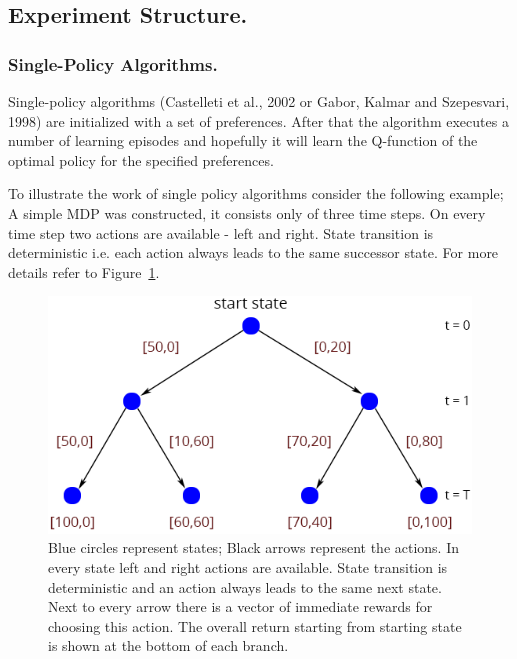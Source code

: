 \subsection{Experiment Structure.}

\subsubsection{Single-Policy Algorithms.}

Single-policy algorithms (Castelleti et al., 2002\nocite{castelletti2002reinforcement} or Gabor, Kalmar and Szepesvari, 1998\nocite{gabor1998multi}) are initialized with a set of preferences. After that the algorithm executes a number of learning episodes and hopefully it will learn the Q-function of the optimal policy for the specified preferences.

To illustrate the work of single policy algorithms consider the following example; A simple MDP was constructed, it consists only of three time steps. On every time step two actions are available - left and right. State transition is deterministic i.e. each action always leads to the same successor state. For more details refer to Figure~\ref{fig:decisionTree}.\\

\begin{figure}[ht]
\centering
\includegraphics[scale=0.6]{decisionTree.png}
\caption{Blue circles represent states; Black arrows represent the actions. In every state left and right actions are available. State transition is deterministic and an action always leads to the same next state. Next to every arrow there is a vector of immediate rewards for choosing this action. The overall return starting from starting state is shown at the bottom of each branch.}
\label{fig:decisionTree}
\end{figure}

